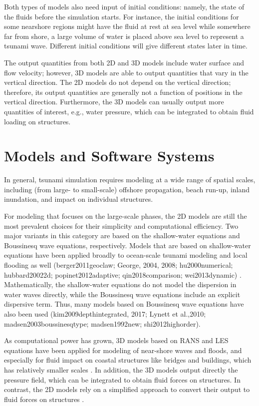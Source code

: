 Both types of models also need input of initial conditions: namely, the state of the fluids before the simulation starts. For instance, the initial conditions for some nearshore regions might have the fluid at rest at sea level while somewhere far from shore, a large volume of water is placed above sea level to represent a tsunami wave. Different initial conditions will give different states later in time.

The output quantities from both 2D and 3D models include water surface and flow velocity; however, 3D models are able to output quantities that vary in the vertical direction. The 2D models do not depend on the vertical direction; therefore, its output quantities are generally not a function of positions in the vertical direction. Furthermore, the 3D models can usually output more quantities of interest, e.g., water pressure, which can be integrated to obtain fluid loading on structures.

\section{Models and Software Systems}
\label{sec:tsunami_tools}

In general, tsunami simulation requires modeling at a wide range of spatial scales, including (from large- to small-scale) offshore propagation, beach run-up, inland inundation, and impact on individual structures.

For modeling that focuses on the large-scale phases, the 2D models are still the most prevalent choices for their simplicity and computational efficiency. Two major variants in this category are based on the shallow-water equations and Boussinesq wave equations, respectively. Models that are based on shallow-water equations have been applied broadly to ocean-scale tsunami modeling and local flooding as well (berger2011geoclaw; George, 2004, 2008; hu2000numerical; hubbard20022d; popinet2012adaptive; qin2018comparison; wei2013dynamic) . Mathematically, the shallow-water equations do not model the dispersion in water waves directly, while the Boussinesq wave equations include an explicit dispersive term. Thus, many models based on Boussinesq wave equations have also been used (kim2009depthintegrated, 2017; Lynett et al.,2010; madsen2003boussinesqtype; madsen1992new; shi2012highorder). 

As computational power has grown, 3D models based on RANS and LES equations have been applied for modeling of near-shore waves and floods, and especially for fluid impact on coastal structures like bridges and buildings, which has relatively smaller scales \citep{biscarini2010computational, choi2007threedimensional, larsen2017tsunamiinduced, mayer2000simulation, montagna20113d, williams2016numerical}. In addition, the 3D models output directly the pressure field, which can be integrated to obtain fluid forces on structures. In contrast, the 2D models rely on a simplified approach to convert their output to fluid forces on structures \citep{Motley et al., 2015, qin2016threedimensional, qin2018comparison, sarfaraz2017sph}. 

